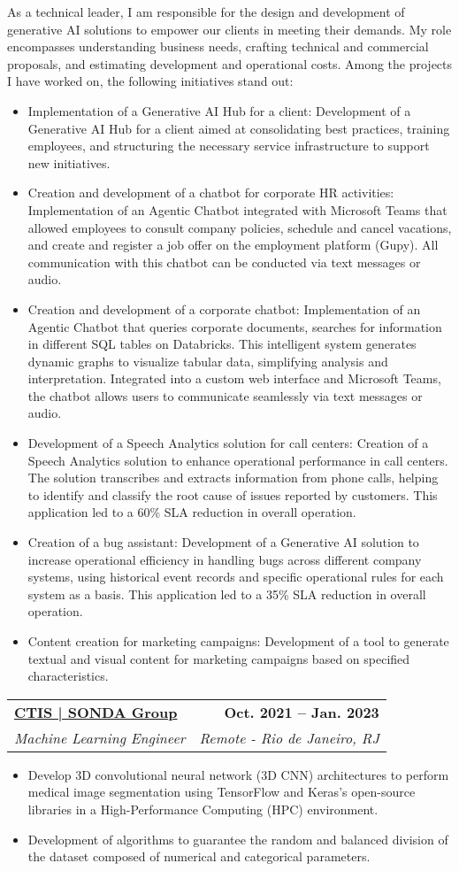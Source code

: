\documentclass[letterpaper,11pt]{article}
\makeatletter
\newcommand{\resumeItem}[1]{
  \item\small{
    {#1 \vspace{-2pt}}
  }
}
\newcommand{\resumeSubheading}[4]{
  \vspace{-2pt}\item
    \begin{tabular*}{1.0\textwidth}[t]{l@{\extracolsep{\fill}}r}
      \textbf{#1} & \textbf{\small #2} \\
      \textit{\small#3} & \textit{\small #4} \\
    \end{tabular*}\vspace{-7pt}
}
\newcommand{\resumeItemListStart}{\begin{itemize}}
\newcommand{\resumeItemListEnd}{\end{itemize}\vspace{-5pt}}
\makeatother
\begin{document}
As a technical leader, I am responsible for the design and development of generative AI solutions to empower our clients in meeting their demands. My role encompasses understanding business needs, crafting technical and commercial proposals, and estimating development and operational costs. Among the projects I have worked on, the following initiatives stand out:
\resumeItemListStart
\resumeItem{Implementation of a Generative AI Hub for a client: Development of a Generative AI Hub for a client aimed at consolidating best practices, training employees, and structuring the necessary service infrastructure to support new initiatives.}
\resumeItem{Creation and development of a chatbot for corporate HR activities: Implementation of an Agentic Chatbot integrated with Microsoft Teams that allowed employees to consult company policies, schedule and cancel vacations, and create and register a job offer on the employment platform (Gupy). All communication with this chatbot can be conducted via text messages or audio.}
\resumeItem{Creation and development of a corporate chatbot: Implementation of an Agentic Chatbot that queries corporate documents, searches for information in different SQL tables on Databricks. This intelligent system generates dynamic graphs to visualize tabular data, simplifying analysis and interpretation. Integrated into a custom web interface and Microsoft Teams, the chatbot allows users to communicate seamlessly via text messages or audio.}
\resumeItem{Development of a Speech Analytics solution for call centers: Creation of a Speech Analytics solution to enhance operational performance in call centers. The solution transcribes and extracts information from phone calls, helping to identify and classify the root cause of issues reported by customers. This application led to a 60\% SLA reduction in overall operation.}
\resumeItem{Creation of a bug assistant: Development of a Generative AI solution to increase operational efficiency in handling bugs across different company systems, using historical event records and specific operational rules for each system as a basis. This application led to a 35\% SLA reduction in overall operation.}
\resumeItem{Content creation for marketing campaigns: Development of a tool to generate textual and visual content for marketing campaigns based on specified characteristics.}
\resumeItemListEnd

\resumeSubheading
{\href{https://www.ctis.com.br}{CTIS | SONDA Group}}{Oct. 2021 -- Jan. 2023}
{Machine Learning Engineer}{Remote - Rio de Janeiro, RJ}
\resumeItemListStart
\resumeItem{Develop 3D convolutional neural network (3D CNN) architectures to perform medical image segmentation using TensorFlow and Keras's open-source libraries in a High-Performance Computing (HPC) environment.}
\resumeItem{Development of algorithms to guarantee the random and balanced division of the dataset composed of numerical and categorical parameters.}
\resumeItemListEnd
\end{document}
